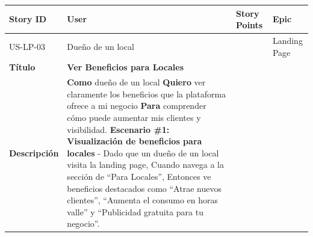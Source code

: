 {\def\LTcaptype{none} %
\begin{longtable}[]{@{}
  >{\raggedright\arraybackslash}p{}
  >{\raggedright\arraybackslash}p{}
  >{\raggedright\arraybackslash}p{}
  >{\raggedright\arraybackslash}p{}@{}}
\toprule\noalign{}
\begin{minipage}[b]{\linewidth}\raggedright
Story ID
\end{minipage} & \begin{minipage}[b]{\linewidth}\raggedright
User
\end{minipage} & \begin{minipage}[b]{\linewidth}\raggedright
Story Points
\end{minipage} & \begin{minipage}[b]{\linewidth}\raggedright
Epic
\end{minipage} \\
\midrule\noalign{}
\endhead
\bottomrule\noalign{}
\endlastfoot
US-LP-03 & Dueño de un local & 2 & Landing Page \\
\textbf{Título} & \textbf{Ver Beneficios para Locales} & & \\
\textbf{Descripción} & \textbf{Como} dueño de un local \textbf{Quiero}
ver claramente los beneficios que la plataforma ofrece a mi negocio
\textbf{Para} comprender cómo puede aumentar mis clientes y visibilidad.
\textbf{Escenario \#1: Visualización de beneficios para locales} - Dado
que un dueño de un local visita la landing page, Cuando navega a la
sección de ``Para Locales'', Entonces ve beneficios destacados como
``Atrae nuevos clientes'', ``Aumenta el consumo en horas valle'' y
``Publicidad gratuita para tu negocio''. & & \\
\end{longtable}
}

